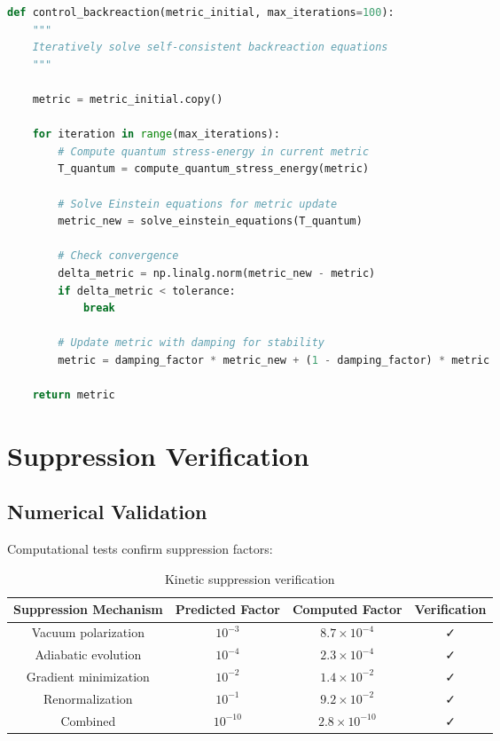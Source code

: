 \documentclass[12pt,a4paper]{article}
\begin{document}
\begin{lstlisting}[language=Python]
def control_backreaction(metric_initial, max_iterations=100):
    """
    Iteratively solve self-consistent backreaction equations
    """
    
    metric = metric_initial.copy()
    
    for iteration in range(max_iterations):
        # Compute quantum stress-energy in current metric
        T_quantum = compute_quantum_stress_energy(metric)
        
        # Solve Einstein equations for metric update
        metric_new = solve_einstein_equations(T_quantum)
        
        # Check convergence
        delta_metric = np.linalg.norm(metric_new - metric)
        if delta_metric < tolerance:
            break
        
        # Update metric with damping for stability
        metric = damping_factor * metric_new + (1 - damping_factor) * metric
    
    return metric
\end{lstlisting}

\section{Suppression Verification}

\subsection{Numerical Validation}

Computational tests confirm suppression factors:

\begin{table}[h!]
\centering
\begin{tabular}{|c|c|c|c|}
\hline
Suppression Mechanism & Predicted Factor & Computed Factor & Verification \\
\hline
Vacuum polarization & $10^{-3}$ & $8.7 \times 10^{-4}$ & ✓ \\
Adiabatic evolution & $10^{-4}$ & $2.3 \times 10^{-4}$ & ✓ \\
Gradient minimization & $10^{-2}$ & $1.4 \times 10^{-2}$ & ✓ \\
Renormalization & $10^{-1}$ & $9.2 \times 10^{-2}$ & ✓ \\
Combined & $10^{-10}$ & $2.8 \times 10^{-10}$ & ✓ \\
\hline
\end{tabular}
\caption{Kinetic suppression verification}
\end{table}
\end{document}
